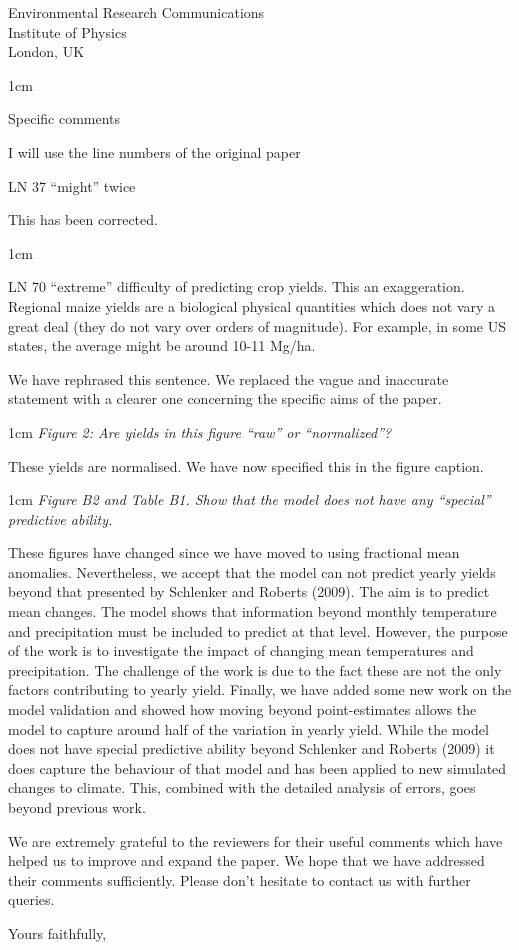 \documentclass{letter}
\newcommand{\review}[1]{   
    \begin{adjustwidth}{1cm}{}
    \em{#1}
    \end{adjustwidth}
    }
\begin{document}
\begin{letter}{Environmental Research Communications \\ Institute of Physics \\ London, UK}
\review{
Specific comments

I will use the line numbers of the original paper

LN 37 “might” twice
}

This has been corrected.

\review{

LN 70 “extreme” difficulty of predicting crop yields. This an exaggeration. Regional maize yields are a biological physical quantities which does not vary a great deal (they do not vary over orders of magnitude). For example, in some US states, the average might be around 10-11 Mg/ha.
}

We have rephrased this sentence. We replaced the vague and inaccurate statement with a clearer one concerning the specific aims of the paper.

\review{
Figure 2: Are yields in this figure “raw” or “normalized”?
}

These yields are normalised. We have now specified this in the figure caption. 

\review{
Figure B2 and Table B1. Show that the model does not have any ``special'' predictive ability.
}

These figures have changed since we have moved to using fractional mean anomalies. Nevertheless, we accept that the model can not predict yearly yields beyond that presented by Schlenker and Roberts (2009). The aim is to predict mean changes. The model shows that information beyond monthly temperature and precipitation must be included to predict at that level. However, the purpose of the work is to investigate the impact of changing mean temperatures and precipitation. The challenge of the work is due to the fact these are not the only factors contributing to yearly yield. Finally, we have added some new work on the model validation and showed how moving beyond point-estimates allows the model to capture around half of the variation in yearly yield. While the model does not have special predictive ability beyond Schlenker and Roberts (2009) it does capture the behaviour of that model and has been applied to new simulated changes to climate. This, combined with the detailed analysis of errors, goes beyond previous work.

We are extremely grateful to the reviewers for their useful comments which have helped us to improve and expand the paper. We hope that we have addressed their comments sufficiently. Please don't hesitate to contact us with further queries.

\closing{Yours faithfully,}

\end{letter}
\end{document}
